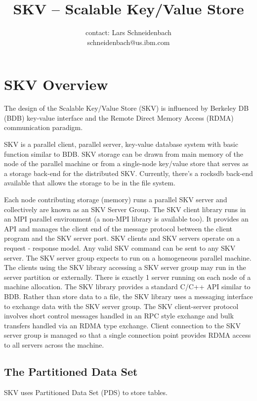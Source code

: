 \documentclass[a4paper, 10pt]{article}
\title{SKV -- Scalable Key/Value Store}
\author{contact: Lars Schneidenbach \\
  schneidenbach@us.ibm.com
}
\begin{document}
\maketitle
\tableofcontents

\section{SKV Overview}\label{sec:overview}
The design of the Scalable Key/Value Store (SKV) is influenced by
Berkeley DB (BDB) key-value interface and the Remote Direct Memory
Access (RDMA) communication paradigm.  

SKV is a parallel client, parallel server, key-value database system
with basic function similar to BDB. SKV storage can be drawn from main
memory of the node of the parallel machine or from a single-node
key/value store that serves as a storage back-end for the distributed
SKV.  Currently, there's a rocksdb back-end available that allows the
storage to be in the file system.

Each node contributing storage (memory) runs a parallel SKV server and
collectively are known as an SKV Server Group. The SKV client library
runs in an MPI parallel environment (a non-MPI library is available
too).  It provides an API and manages the client end of the message
protocol between the client program and the SKV server port.  SKV
clients and SKV servers operate on a request - response model.  Any
valid SKV command can be sent to any SKV server.  The SKV server group
expects to run on a homogeneous parallel machine.  The clients using
the SKV library accessing a SKV server group may run in the server
partition or externally.  There is exactly 1 server running on each
node of a machine allocation.  The SKV library provides a standard
C/C++ API similar to BDB.  Rather than store data to a file, the SKV
library uses a messaging interface to exchange data with the SKV
server group.  The SKV client-server protocol involves short control
messages handled in an RPC style exchange and bulk transfers handled
via an RDMA type exchange.  Client connection to the SKV server group
is managed so that a single connection point provides RDMA access to
all servers across the machine.


\subsection{The Partitioned Data Set}\label{sec:overview:pds}
SKV uses Partitioned Data Set (PDS) to store tables.
\end{document}
